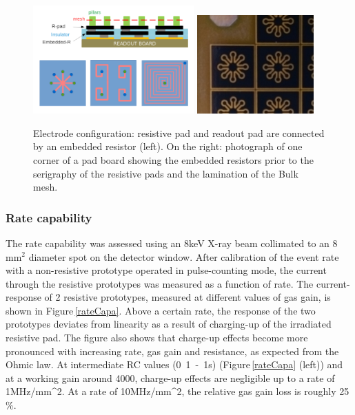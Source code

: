 \documentclass{article}
\begin{document}
\begin{figure}[h]
\begin{centering}
  \includegraphics[width=0.55\textwidth]{embeddedR}
  \includegraphics[width=0.4\textwidth]{star_pattern}
  \caption{Electrode configuration: resistive pad and readout pad are connected by an embedded resistor (left). On the right: photograph of one corner of a pad board showing the embedded resistors prior to the serigraphy of the resistive pads and the lamination of the Bulk mesh.}
\label{embeddedR}
\end{centering}
\end{figure}


\subsubsection{Rate capability}

The rate capability was assessed using an \unit{8}{keV} X-ray beam collimated to an 8\,mm$^{2}$ diameter spot on the detector window. After calibration of the event rate with a non-resistive prototype operated in pulse-counting mode, the current through the resistive prototypes was measured as a function of rate.
The current-response of 2 resistive prototypes, measured at different values of gas gain, is shown in Figure\,\ref{rateCapa}.
Above a certain rate, the response of the two prototypes deviates from linearity as a result of charging-up of the irradiated resistive pad.
The figure also shows that charge-up effects become more pronounced with increasing rate, gas gain and resistance, as expected from the Ohmic law.
At intermediate RC values (\unit{0.1-1}{\micro s}) (Figure\,\ref{rateCapa} (left)) and at a working gain around 4000, charge-up effects are negligible up to a rate of \unit{1}{MHz/mm^{2}}. At a rate of \unit{10}{MHz/mm^{2}}, the relative gas gain loss is roughly 25\,\%.
\end{document}

